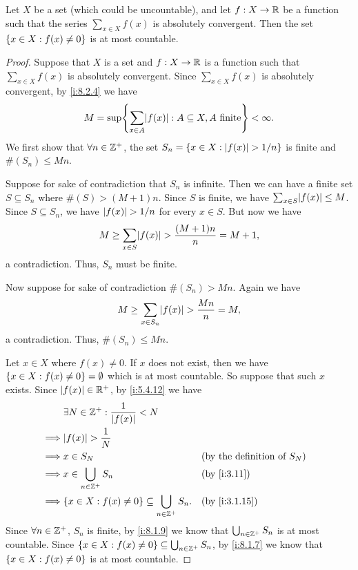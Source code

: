 \begin{lem}\label{i:8.2.5}
  Let \(X\) be a set (which could be uncountable), and let \(f : X \to \mathbb{R}\) be a function such that the series \(\sum_{x \in X} f(x)\) is absolutely convergent.
  Then the set \(\left\lbrace x \in X : f(x) \neq 0\right\rbrace\) is at most countable.
\end{lem}

\begin{proof}
  Suppose that \(X\) is a set and \(f : X \to \mathbb{R}\) is a function such that \(\sum_{x \in X} f(x)\) is absolutely convergent.
  Since \(\sum_{x \in X} f(x)\) is absolutely convergent, by \cref{i:8.2.4} we have
  \[
    M = \sup\set{\sum_{x \in A} \abs{f(x)} : A \subseteq X, A \text{ finite}} < \infty.
  \]
  We first show that \(\forall n \in \mathbb{Z}^+\), the set \(S_n = \left\lbrace x \in X : \left\lvert f(x)\right\rvert > 1 / n\right\rbrace\) is finite and \(\#(S_n) \leq Mn\).

  Suppose for sake of contradiction that \(S_n\) is infinite.
  Then we can have a finite set \(S \subseteq S_n\) where \(\#(S) > (M + 1)n\).
  Since \(S\) is finite, we have \(\sum_{x \in S} \abs{f(x)} \leq M\).
  Since \(S \subseteq S_n\), we have \(\left\lvert f(x)\right\rvert > 1 / n\) for every \(x \in S\).
  But now we have
  \[
    M \geq \sum_{x \in S} \abs{f(x)} > \dfrac{(M + 1)n}{n} = M + 1,
  \]
  a contradiction.
  Thus, \(S_n\) must be finite.

  Now suppose for sake of contradiction \(\#(S_n) > Mn\).
  Again we have
  \[
    M \geq \sum_{x \in S_n} \abs{f(x)} > \dfrac{Mn}{n} = M,
  \]
  a contradiction.
  Thus, \(\#(S_n) \leq Mn\).

  Let \(x \in X\) where \(f(x) \neq 0\).
  If \(x\) does not exist, then we have \(\left\lbrace x \in X : f(x) \neq 0\right\rbrace = \emptyset\) which is at most countable.
  So suppose that such \(x\) exists.
  Since \(\left\lvert f(x)\right\rvert \in \mathbb{R}^+\), by \cref{i:5.4.12} we have
  \begin{align*}
             & \exists N \in \Z^+ : \dfrac{1}{\abs{f(x)}} < N                                                             \\
    \implies & \abs{f(x)} > \dfrac{1}{N}                                                                                  \\
    \implies & x \in S_N                                                       &  & \text{(by the definition of \(S_N\))} \\
    \implies & x \in \bigcup_{n \in \Z^+} S_n                                  &  & \by{i:3.11}                           \\
    \implies & \set{x \in X : f(x) \neq 0} \subseteq \bigcup_{n \in \Z^+} S_n. &  & \by{i:3.1.15}
  \end{align*}
  Since \(\forall n \in \mathbb{Z}^+\), \(S_n\) is finite, by \cref{i:8.1.9} we know that \(\bigcup_{n \in \mathbb{Z}^+} S_n\) is at most countable.
  Since \(\left\lbrace x \in X : f(x) \neq 0\right\rbrace \subseteq \bigcup_{n \in \mathbb{Z}^+} S_n\), by \cref{i:8.1.7} we know that \(\left\lbrace x \in X : f(x) \neq 0\right\rbrace\) is at most countable.
\end{proof}

